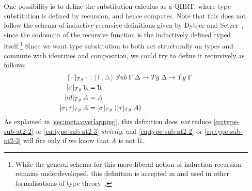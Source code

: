 \documentclass[a4paper,UKenglish,numberwithinsect,cleveref,thm-restate]{lipics-v2021}
\begin{document}
One possibility is to define the substitution calculus as a QIIRT, where type substitution is defined by recursion, and hence computes.
Note that this does not follow the schema of inductive-recursive definitions given by Dybjer and Setzer~\cite{Dybjer2000,Dybjer2003}, since the codomain of the recursive function is the inductively defined typed itself.\footnote{%
  While the general schema for this more liberal notion of induction-recursion remains underdeveloped, this definition is accepted in \Agda and used in other formalisations of type theory~\cite{Danielsson2006}.}
%
Since we want type substitution to both act structurally on types and commute with identities and composition, we could try to define it recursively as follows:
\begin{alignat}{3}
[\blank]_{\Ty} \blank &: \implicit{\Gamma, \Delta} \; \Sub\;\Gamma\;\Delta \to \Ty\;\Delta \to \Ty\;\Gamma \nonumber \\
[ \sigma ]_{\Ty}       \;\UU  & = \UU                                   \label{eq:type-sub-at2-1} \\
[ \idS ]_{\Ty}         \;A    & = A                                     \label{eq:type-sub-at2-2} \\
[ \sigma ; \tau ]_{\Ty}\;A    & = [ \sigma ]_{\Ty}\;([ \tau ]_{\Ty}\;A) \label{eq:type-sub-at2-3}
\end{alignat}
As explained in \cref{sec:meta:overlapping}, this definition does \emph{not} reduce \eqref{eq:type-sub-at2-2} or \eqref{eq:type-sub-at2-3} \emph{strictly}, and \eqref{eq:type-sub-at2-2} or \eqref{eq:type-sub-at2-3} will fire only if we know that $A$ is not $\mathcal{U}$.
\end{document}
